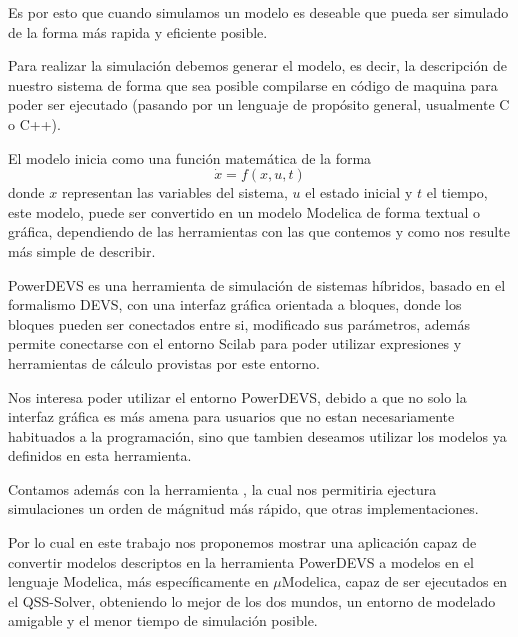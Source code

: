 Es por esto que cuando simulamos un modelo es deseable que pueda ser simulado de la forma más rapida y eficiente posible.

Para realizar la simulación debemos generar el modelo, es decir, la descripción de nuestro sistema de forma que sea posible compilarse en código de maquina para poder ser ejecutado (pasando por un lenguaje de propósito general, usualmente C o C++). 

El modelo inicia como una función matemática de la forma 
\begin{equation*}
	\dot{x} = f(x, u, t)
\end{equation*}
donde $x$ representan las variables del sistema, $u$ el estado inicial y $t$ el tiempo, este modelo, puede ser convertido en un modelo Modelica\cite{Fri98}\cite{Fritzson02modelica} de forma textual o gráfica, dependiendo de las herramientas con las que contemos y como nos resulte más simple de describir.

PowerDEVS\cite{BK11} es una herramienta de simulación de sistemas híbridos, basado en el formalismo DEVS\cite{Zeigler}, con una interfaz gráfica orientada a bloques, donde los bloques pueden ser conectados entre si, modificado sus parámetros, además permite conectarse con el entorno Scilab para poder utilizar expresiones y herramientas de cálculo provistas por este entorno.

Nos interesa poder utilizar el entorno PowerDEVS\cite{BK11}, debido a que no solo la interfaz gráfica es más amena para usuarios que no estan necesariamente habituados a la programación, sino que tambien deseamos utilizar los modelos ya definidos en esta herramienta.

Contamos además con la herramienta \cite{Ber12}, la cual nos permitiria ejectura simulaciones un orden de mágnitud más rápido, que otras implementaciones.

Por lo cual en este trabajo nos proponemos mostrar una aplicación capaz de convertir modelos descriptos en la herramienta PowerDEVS\cite{BK11} a modelos en el lenguaje Modelica\cite{Fri98}\cite{Fritzson02modelica}, más específicamente en $\mu$Modelica\cite{Ber12}, capaz de ser ejecutados en el QSS-Solver\cite{Ber12}, obteniendo lo mejor de los dos mundos, un entorno de modelado amigable y el menor tiempo de simulación posible.



